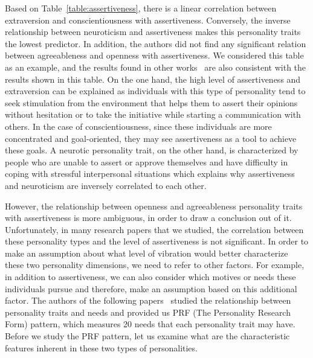 Based on Table~\ref{table:assertiveness}, there is a linear correlation between
extraversion and conscientiousness with assertiveness.
Conversely, the inverse relationship between neuroticism and assertiveness
makes this personality traits the lowest predictor.
In addition, the authors did not find any significant relation between agreeableness and openness with assertiveness.
We considered this table as an example, and the results found in other
works~\cite{kirst2011investigating,ramanaiah1993neo,lefevre1981assertiveness} are
also consistent with the results shown in this table.
On the one hand, the high level of assertiveness and extraversion can be explained
as individuals with this type of personality tend to seek stimulation from the environment
that helps them to assert their opinions without hesitation or to take
the initiative while starting a communication with others.
In the case of conscientiousness, since these individuals are more
concentrated and goal-oriented, they may see assertiveness as a tool to achieve these goals.
A neurotic personality trait, on the other hand, is characterized
by people who are unable to assert or approve themselves and have difficulty in coping with stressful
interpersonal situations which explains why assertiveness and neuroticism are inversely correlated to each other.

However, the relationship between openness and agreeableness personality traits with
assertiveness is more ambiguous, in order to draw a conclusion out of it.
Unfortunately, in many research papers that we studied, the correlation between these
personality types and the level of assertiveness is not significant.
In order to make an assumption about what level of vibration would better characterize
these two personality dimensions, we need to refer to other factors.
For example, in addition to assertiveness, we can also consider which motives or needs these
individuals pursue and therefore, make an assumption based on this additional factor.
The authors of the following papers~\cite{costa1988catalog} studied the relationship between
personality traits and needs and provided us PRF (The Personality Research Form) pattern,
which measures 20 needs that each personality trait may have.
Before we study the PRF pattern, let us examine what are the characteristic features
inherent in these two types of personalities.

